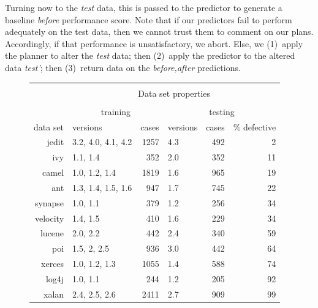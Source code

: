 \documentclass[conference]{IEEEtran}
\begin{document}
Turning now to the {\em test} data, this is passed to the { predictor}
to generate a baseline {\em before} performance score.
Note that if our { predictors} fail to perform adequately on the test data,
then we cannot trust them to comment on our plans. Accordingly,
if that performance is unsatisfactory, we abort.
Else, we (1)~apply the { planner} to alter the {\em test} data;
then (2)~apply the { predictor} to the altered data {\em test'};
then (3)~return data on the {\em before,after} predictions.




\begin{figure}[!t]
\scriptsize
   \begin{center}
   \begin{minipage}{.46\linewidth}
    \begin{tabular}{r@{~}|l@{~}|r@{~}|l@{~}|r@{~}|r@{~}|} \cline{2-6}
   & \multicolumn{5}{c|}{ }\\ 
   
   & \multicolumn{5}{c|}{ Data set  properties}\\ 
   & \multicolumn{5}{c|}{  }\\ 
           & \multicolumn{2}{c|}{training}   & \multicolumn{3}{c|}{testing}      \\ \cline{2-6}
   data set      & versions           & cases & versions     & cases    & \% defective             \\ \hline
        jedit    & 3.2, 4.0, 4.1, 4.2 & 1257      & 4.3          & 492          & 2 \\
        ivy      & 1.1, 1.4           & 352       & 2.0          & 352          & 11 \\
        camel    & 1.0, 1.2, 1.4      & 1819      & 1.6          & 965          & 19 \\
        ant      & 1.3, 1.4, 1.5, 1.6 & 947       & 1.7          & 745          & 22 \\
        synapse  & 1.0, 1.1           & 379       & 1.2          & 256          & 34 \\
        velocity & 1.4, 1.5           & 410       & 1.6          & 229          & 34 \\
        lucene   & 2.0, 2.2           & 442       & 2.4          & 340          & 59 \\
        poi      & 1.5, 2, 2.5        & 936       & 3.0          & 442          & 64 \\
        xerces   & 1.0, 1.2, 1.3      & 1055      & 1.4          & 588          & 74  \\ 
        log4j    & 1.0, 1.1           & 244       & 1.2          & 205          & 92   \\
        xalan    & 2.4, 2.5, 2.6      & 2411      & 2.7          & 909          & 99  \\\hline 
        

\end{tabular}
\end{minipage}
\end{center}
\end{figure}
\end{document}
